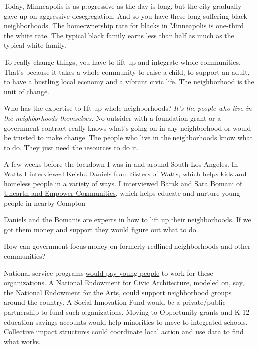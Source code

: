 Today, Minneapolis is as progressive as the day is long, but the city
gradually gave up on aggressive desegregation. And so you have these
long-suffering black neighborhoods. The homeownership rate for blacks in
Minneapolis is one-third the white rate. The typical black family earns
less than half as much as the typical white family.

To really change things, you have to lift up and integrate whole
communities. That's because it takes a whole community to raise a child,
to support an adult, to have a bustling local economy and a vibrant
civic life. The neighborhood is the unit of change.

Who has the expertise to lift up whole neighborhoods? \emph{It's the
people who live in the neighborhoods themselves.} No outsider with a
foundation grant or a government contract really knows what's going on
in any neighborhood or would be trusted to make change. The people who
live in the neighborhoods know what to do. They just need the resources
to do it.

A few weeks before the lockdown I was in and around South Los Angeles.
In Watts I interviewed Keisha Daniels from
\href{https://sistersofwatts.org/}{Sisters of Watts}, which helps kids
and homeless people in a variety of ways. I interviewed Barak and Sara
Bomani of \href{https://www.unearthandempower.org/}{Unearth and Empower
Communities}, which helps educate and nurture young people in nearby
Compton.

Daniels and the Bomanis are experts in how to lift up their
neighborhoods. If we got them money and support they would figure out
what to do.

How can government focus money on formerly redlined neighborhoods and
other communities?

National service programs
\href{https://www.nytimes.com/2020/05/07/opinion/national-service-americorps-coronavirus.html}{would
pay young people} to work for these organizations. A National Endowment
for Civic Architecture, modeled on, say, the National Endowment for the
Arts, could support neighborhood groups around the country. A Social
Innovation Fund would be a private/public partnership to fund such
organizations. Moving to Opportunity grants and K-12 education savings
accounts would help minorities to move to integrated schools.
\href{https://www.nytimes.com/2018/10/08/opinion/collective-impact-community-civic-architecture.html}{Collective
impact structures} could coordinate
\href{https://www.nytimes.com/2019/04/04/opinion/canada-poverty-record.html}{local
action} and use data to find what works.

